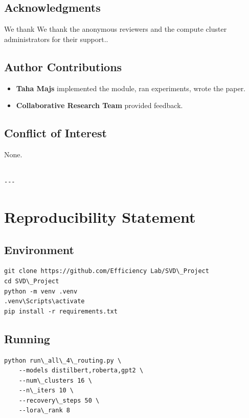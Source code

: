 \subsection{Acknowledgments}

We thank We thank the anonymous reviewers and the compute cluster administrators for their support..

\subsection{Author Contributions}

\begin{itemize}
\item \textbf{Taha Majs} implemented the module, ran experiments, wrote the paper.
\item \textbf{Collaborative Research Team} provided feedback.

\end{itemize}
\subsection{Conflict of Interest}

None.
\begin{lstlisting}

---
\end{lstlisting}


\section{Reproducibility Statement}

\subsection{Environment}

\begin{lstlisting}
git clone https://github.com/Efficiency Lab/SVD\_Project
cd SVD\_Project
python -m venv .venv
.venv\Scripts\activate
pip install -r requirements.txt
\end{lstlisting}

\subsection{Running}

\begin{lstlisting}
python run\_all\_4\_routing.py \
    --models distilbert,roberta,gpt2 \
    --num\_clusters 16 \
    --n\_iters 10 \
    --recovery\_steps 50 \
    --lora\_rank 8
\end{lstlisting}

